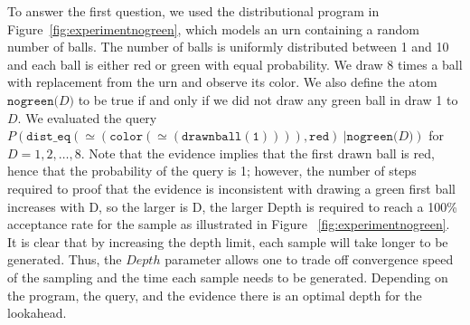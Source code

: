 \documentclass{tlp}
\begin{document}
To answer the first question, we used the distributional program in
Figure~\ref{fig:experimentnogreen}, which models an urn containing a
random number of balls. The number of balls is uniformly distributed
between 1 and 10 and each ball is either red or green with equal
probability. We draw 8 times a ball with replacement from the urn and
observe its color. We also define the atom
$\mathtt{nogreen(}D\mathtt{)}$ to be true if and only if we did not
draw any green ball in draw 1 to $D$.  We evaluated the query
$P(\mathtt{dist\_eq(\simeq(color(\simeq(drawnball(1)))),red)}\
|\mathtt{nogreen(}D\mathtt{)})$ for $D=1,2,\ldots, 8$.  Note that the
evidence implies that the first drawn ball is red, hence that the
probability of the query is 1; however, the number of steps required
to proof that the evidence is inconsistent with drawing a green first
ball increases with D, so the larger is D, the larger Depth is
required to reach a 100\% acceptance rate for the sample as
illustrated in Figure ~\ref{fig:experimentnogreen}.  It is clear that
by increasing the depth limit, each sample will take longer to be
generated. Thus, the $Depth$ parameter allows one to trade off
convergence speed of the sampling and the time each sample needs to be
generated. Depending on the program, the query, and the evidence there
is an optimal depth for the lookahead.
\end{document}
